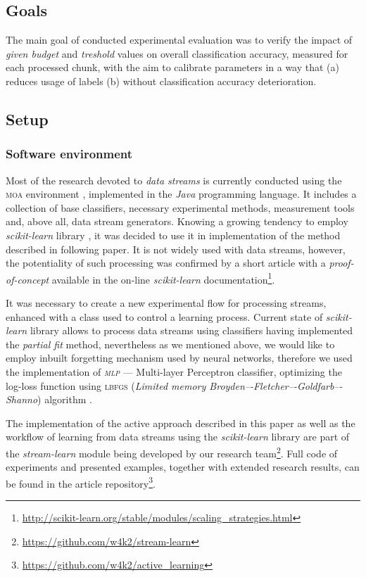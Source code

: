 \subsection{Goals}
\label{subsec:exp:goals}
\noindent The main goal of conducted experimental evaluation was to verify the impact of \emph{given budget} and \emph{treshold} values on overall classification accuracy, measured for each processed chunk, with the aim to calibrate parameters in a way that (a) reduces usage of labels (b) without classification accuracy deterioration.

\subsection{Setup}
\label{subsec:exp:setup}

\subsubsection{Software environment}

\noindent Most of the research devoted to \emph{data streams} is currently conducted using the \textsc{moa} environment \cite{Bifet:2010}, implemented in the \emph{Java} programming language. It includes a collection of base classifiers, necessary experimental methods, measurement tools and, above all, data stream generators. Knowing a growing tendency to employ \emph{scikit-learn} library \cite{scikit-learn}, it was decided to use it in implementation of the method described in following paper. It is not widely used with data streams, however, the potentiality of such processing was confirmed by a short article with a \emph{proof-of-concept} available in the on-line \emph{scikit-learn} documentation\footnote{\url{http://scikit-learn.org/stable/modules/scaling_strategies.html}}. 

It was necessary to create a new experimental flow for processing streams, enhanced with a class used to control a learning process. Current state of \emph{scikit-learn} library allows to process data streams using classifiers having implemented the \emph{partial fit} method, nevertheless as we mentioned above, we would like to employ inbuilt forgetting mechanism used by neural networks, therefore we used the implementation of \emph{\textsc{mlp}} --- Multi-layer Perceptron classifier, optimizing the log-loss function using \textsc{lbfgs} (\emph{Limited memory Broyden–-Fletcher–-Goldfarb–-Shanno}) algorithm \cite{Mokhtari:2015}.

The implementation of the active approach described in this paper as well as the workflow of learning from data streams using the \emph{scikit-learn} library are part of the \emph{stream-learn} module being developed by our research team\footnote{\url{https://github.com/w4k2/stream-learn}}. Full code of experiments and presented examples, together with extended research results, can be found in the article repository\footnote{\url{https://github.com/w4k2/active_learning}}.

